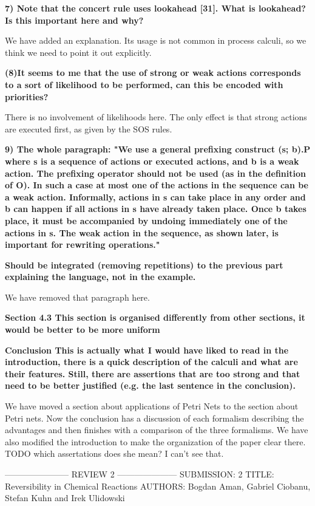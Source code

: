 \documentclass{article}
\begin{document}
\textbf{7) Note that the concert rule uses lookahead [31].
What is lookahead? Is this important here and why?}

We have added an explanation. Its usage is not common in process calculi, so we think we need to point it out explicitly.

\textbf{(8)It seems to me that the use of strong or weak actions corresponds to a sort of likelihood to be performed, can this be encoded with priorities?}

There is no involvement of likelihoods here. The only effect is that strong actions are executed first, as given by the SOS rules.

\textbf{9) The whole paragraph:
"We use a general prefixing construct (s; b).P where s is a sequence of actions or executed actions, and b is a weak action. The prefixing operator should not be used (as in the definition of O). In such a case at most one of the actions in the sequence can be a weak action. Informally, actions in s can take place in any order and b can happen if all actions in s have already taken place. Once b takes place, it must be accompanied by undoing immediately one of the actions in s. The weak action in the sequence, as shown later, is important for rewriting operations."}

\textbf{Should be integrated (removing repetitions) to the previous part explaining the language, not in the example.}

We have removed that paragraph here.

\textbf{Section 4.3
This section is organised differently from other sections, it would be better to be more uniform}

\textbf{Conclusion
This is actually what I would have liked to read in the introduction, there is a quick description of the calculi and what are their features.
Still, there are assertions that are too strong and that need to be better justified (e.g. the last sentence in the conclusion).}

We have moved a section about applications of Petri Nets to the section about Petri nets. Now the conclusion has a discussion of each formalism describing the advantages and then finishes with a comparison of the three formalisms. We have also modified the introduction to make the organization of the paper clear there.
TODO which assertations does she mean? I can't see that.

----------------------- REVIEW 2 ---------------------
SUBMISSION: 2
TITLE: Reversibility in Chemical Reactions
AUTHORS: Bogdan Aman, Gabriel Ciobanu, Stefan Kuhn and Irek Ulidowski
\end{document}
